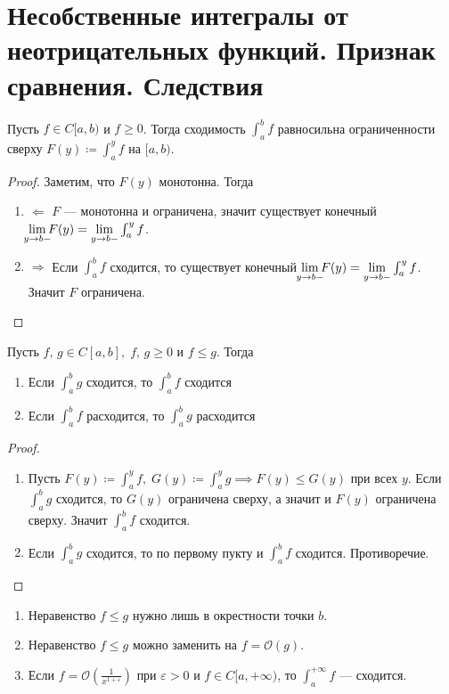 \section{Несобственные интегралы от неотрицательных функций. Признак сравнения. Следствия}
\begin{theorem}
    Пусть $f \in C[a, b)$ и $f \geq 0$. Тогда сходимость $\int_{a}^{b} f$ равносильна ограниченности сверху $F(y) \coloneqq \int_{a}^{y} f$ на $[a, b)$.
  \end{theorem}
  \begin{proof}
    Заметим, что $F(y)$ монотонна. Тогда
    \begin{enumerate}
      \item[]$\boxed{\Leftarrow}$
      $F$ --- монотонна и ограничена, значит существует конечный $\lim\limits_{\mathclap{y \to b-}}F(y) = \lim\limits_{y \to b-}\int_{a}^{y} f$.
      \item[]$\boxed{\Rightarrow}$
      Если $\int_{a}^{b} f$ сходится, то существует конечный $\lim\limits_{\mathclap{y \to b-}} F(y) = \lim\limits_{y \to b-} \int_{a}^{y} f$. Значит $F$ ограничена.
    \end{enumerate}
  \end{proof}
  
  \begin{theorem}
  Пусть $f,\, g \in C[a, b], \; f,\, g \geq 0$ и $f \leq g$. Тогда
  \begin{enumerate}
      \item Если $\int_{a}^{b} g$ сходится, то $\int_{a}^{b} f$ сходится
      \item Если $\int_{a}^{b} f$ расходится, то $\int_{a}^{b} g$ расходится
  \end{enumerate}
  \end{theorem}
  \begin{proof}
    \begin{enumerate}
      \item Пусть $F(y) \coloneqq \int_{a}^{y} f, \; G(y) \coloneqq \int_{a}^{y} g \implies F(y) \leq G(y)$ при всех $y$. Если $\int_{a}^{b} g$ сходится, то $G(y)$ ограничена сверху, а значит и $F(y)$ ограничена сверху. Значит $\int_{a}^{b} f$ сходится.
      \item Если $\int_{a}^{b} g$ сходится, то по первому пукту и $\int_{a}^{b} f$ сходится. Противоречие.
      \end{enumerate}
  \end{proof}
  
  \begin{notice}
    \begin{enumerate}
      \item Неравенство $f \leq g$ нужно лишь в окрестности точки $b$.
      \item Неравенство $f \leq g$ можно заменить на $f = \mathcal{O}(g)$.
      \item Если $f = \mathcal{O}(\frac{1}{x^{1 + \varepsilon}})$ при $\varepsilon > 0$ и $f \in C[a, +\infty)$, то $\int_{a}^{+\infty} f$ --- сходится.
    \end{enumerate}
  \end{notice}
  
